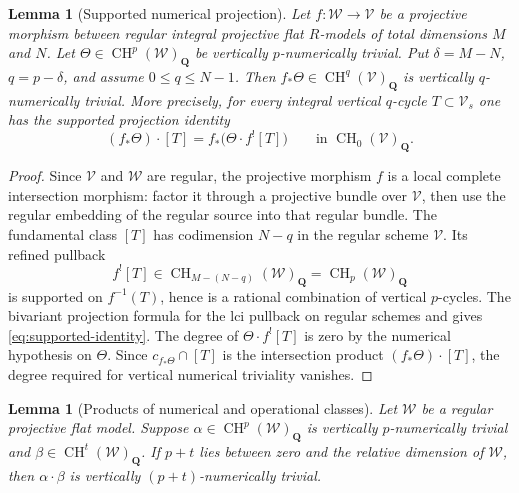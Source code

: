 \documentclass[11pt]{article}
\newtheorem{lemma}[theorem]{Lemma}
\theoremstyle{definition}
\theoremstyle{remark}
\numberwithin{equation}{section}
\newcommand{\CH}{\operatorname{CH}}
\begin{document}
\begin{lemma}[Supported numerical projection]
\label{lem:supported-numerical-projection}
Let $f:\mathcal W\to\mathcal V$ be a projective morphism between
regular integral projective flat $R$-models of total dimensions
$M$ and $N$.  Let $\Theta\in\CH^p(\mathcal W)_{\mathbf Q}$ be
vertically $p$-numerically trivial.  Put
$\delta=M-N$, $q=p-\delta$, and assume $0\le q\le N-1$.
Then $f_*\Theta\in\CH^q(\mathcal V)_{\mathbf Q}$ is vertically
$q$-numerically trivial.
More precisely, for every integral vertical $q$-cycle
$T\subset\mathcal V_s$ one has the supported projection identity
\begin{equation}\label{eq:supported-identity}
 (f_*\Theta)\cdot[T]
   = f_*\bigl(\Theta\cdot f^![T]\bigr)
                      \qquad\text{in }\CH_0(\mathcal V)_{\mathbf Q}.
\end{equation}
\end{lemma}

\begin{proof}
Since $\mathcal V$ and $\mathcal W$ are regular, the projective
morphism $f$ is a local complete intersection morphism: factor it
through a projective bundle over $\mathcal V$, then use the
regular embedding of the regular source into that regular bundle.
The fundamental class $[T]$ has codimension $N-q$ in the regular
scheme $\mathcal V$.  Its refined pullback
\[
       f^![T]\in\CH_{M-(N-q)}(\mathcal W)_{\mathbf Q}
                   =\CH_p(\mathcal W)_{\mathbf Q}
\]
is supported on $f^{-1}(T)$, hence is a rational combination of
vertical $p$-cycles.  The bivariant projection formula for the
lci pullback on regular schemes
\cite[Chapter~17]{Fulton} and \cite[Tags~0FF6 and 0FFA]{StacksGysin}
gives \eqref{eq:supported-identity}.
The degree of $\Theta\cdot f^![T]$ is zero by the numerical
hypothesis on $\Theta$.  Since $c_{f_*\Theta}\cap[T]$ is the
intersection product $(f_*\Theta)\cdot[T]$, the degree required
for vertical numerical triviality vanishes.
\end{proof}

\begin{lemma}[Products of numerical and operational classes]
\label{lem:numerical-times-class}
Let $\mathcal W$ be a regular projective flat model.  Suppose
$\alpha\in\CH^p(\mathcal W)_{\mathbf Q}$ is vertically
$p$-numerically trivial and
$\beta\in\CH^t(\mathcal W)_{\mathbf Q}$.
If $p+t$ lies between zero and the relative dimension of
$\mathcal W$, then $\alpha\cdot\beta$ is vertically
$(p+t)$-numerically trivial.
\end{lemma}
\end{document}
